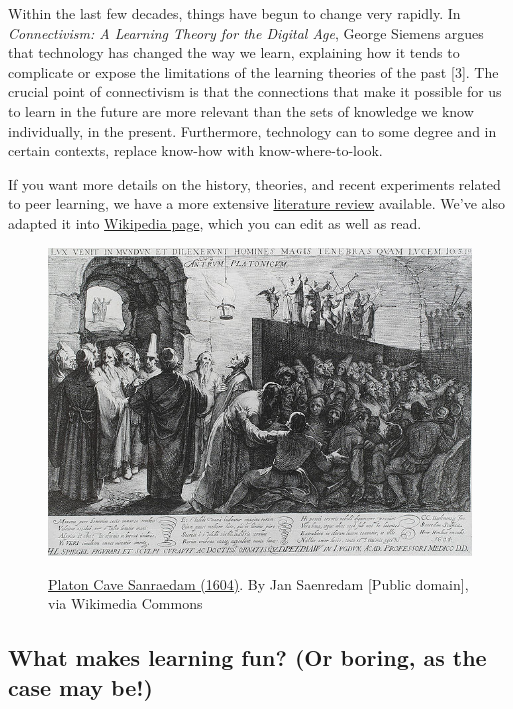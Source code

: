 Within the last few decades, things have begun to change very rapidly.
In \emph{Connectivism: A Learning Theory for the Digital Age}, George
Siemens argues that technology has changed the way we learn, explaining
how it tends to complicate or expose the limitations of the learning
theories of the past {[}3{]}. The crucial point of connectivism is that
the connections that make it possible for us to learn in the future are
more relevant than the sets of knowledge we know individually, in the
present. Furthermore, technology can to some degree and in certain
contexts, replace know-how with know-where-to-look.

If you want more details on the history, theories, and recent
experiments related to peer learning, we have a more extensive
\href{http://peeragogy.org/resources/literature-review-peeragogy/}{literature
review} available. We've also adapted it into
\href{http://en.wikipedia.org/wiki/Peer\_learning}{Wikipedia page},
which you can edit as well as read.

\begin{figure}
\href{http://commons.wikimedia.org/wiki/File:Platon\_Cave\_Sanraedam\_1604.jpg}{\includegraphics[width=\textwidth]{./pictures/plato_cave.jpg}}
 \caption{\href{http://commons.wikimedia.org/w/index.php?title=File:Platon\_Cave\_Sanraedam\_1604.jpg\&oldid=68567627}{Platon Cave Sanraedam (1604)}. By Jan Saenredam {[}Public domain{]}, via
 Wikimedia Commons}
\end{figure}

\subsection{What makes learning fun? (Or boring, as the case may be!)}

